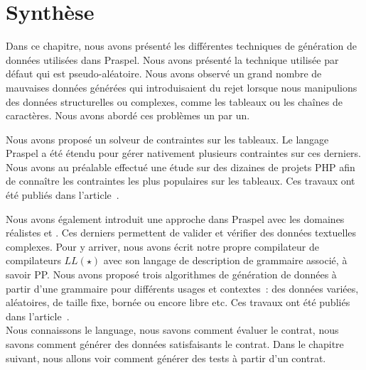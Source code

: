 \section{Synthèse}
\label{section:data:summary}

Dans ce chapitre, nous avons présenté les différentes techniques de génération
de données utilisées dans Praspel. Nous avons présenté la technique utilisée par
défaut qui est pseudo-aléatoire. Nous avons observé un grand nombre de mauvaises
données générées qui introduisaient du rejet lorsque nous manipulions des
données structurelles ou complexes, comme les tableaux ou les chaînes de
caractères. Nous avons abordé ces problèmes un par un.

Nous avons proposé un solveur de contraintes sur les tableaux. Le langage
Praspel a été étendu pour gérer nativement plusieurs contraintes sur ces
derniers. Nous avons au préalable effectué une étude sur des dizaines de projets
PHP afin de connaître les contraintes les plus populaires sur les tableaux. Ces
travaux ont été publiés dans l'article~.

Nous avons également introduit une approche 
dans Praspel avec les domaines réalistes  et . Ces
derniers permettent de valider et vérifier des données textuelles complexes.
Pour y arriver, nous avons écrit notre propre compilateur de compilateurs
$LL(\star)$ avec son langage de description de grammaire associé, à savoir PP.
Nous avons proposé trois algorithmes de génération de données à partir d'une
grammaire pour différents usages et contextes~: des données variées, aléatoires,
de taille fixe, bornée ou encore libre etc. Ces travaux ont été publiés dans
l'article~. \\

Nous connaissons le language, nous savons comment évaluer le contrat, nous
savons comment générer des données satisfaisants le contrat. Dans le chapitre
suivant, nous allons voir comment générer des tests à partir d'un contrat.

